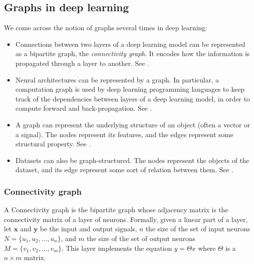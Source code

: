 


\subsection{Graphs in deep learning}

We come across the notion of graphs several times in deep learning:
\begin{itemize}
\item Connections between two layers of a deep learning model can be represented as a bipartite graph, the \emph{connectivity graph}. It encodes how the information is propagated through a layer to another. See .
\item Neural architectures can be represented by a graph. In particular, a computation graph is used by deep learning programming languages to keep track of the dependencies between layers of a deep learning model, in order to compute forward and back-propagation. See .
\item A graph can represent the underlying structure of an object (often a vector or a signal). The nodes represent its features, and the edges represent some structural property. See .
\item Datasets can also be graph-structured. The nodes represent the objects of the dataset, and its edge represent some sort of relation between them. See .
\end{itemize}


\subsubsection{Connectivity graph}
\label{con_graph}

A Connectivity graph is the bipartite graph whose adjacency matrix is the connectivity matrix of a layer of neurons.
Formally, given a linear part of a layer, let $\textbf{x}$ and $\textbf{y}$ be the input and output signals, $n$ the size of the set of input neurons $N = \{u_1, u_2, \ldots, u_n\}$, and $m$ the size of the set of output neurons $M = \{v_1, v_2, \ldots, v_m\}$. This layer implements the equation $y = \Theta x$ where $\Theta$ is a $n \times m$ matrix.

